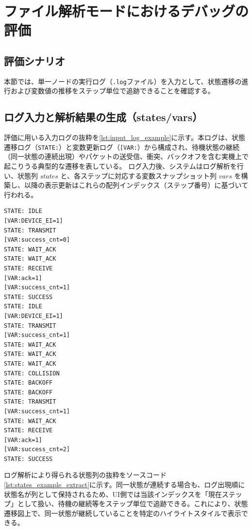 \documentclass[12pt]{jreport}
\begin{document}
\section{ファイル解析モードにおけるデバッグの評価}

\subsection{評価シナリオ}
\begin{par}
本節では、単一ノードの実行ログ（\texttt{.log}ファイル）を入力として、状態遷移の進行および変数値の推移をステップ単位で追跡できることを確認する。
\end{par}

\subsection{ログ入力と解析結果の生成（states/vars）}
\begin{par}
評価に用いる入力ログの抜粋を\ref{lst:input_log_example}に示す。本ログは、状態遷移ログ（\verb|STATE:|）と変数更新ログ（\verb|[VAR:|）から構成され、待機状態の継続（同一状態の連続出現）やパケットの送受信、衝突、バックオフを含む実機上で起こりうる典型的な遷移を表している。
ログ入力後、システムはログ解析を行い、状態列 $states$ と、各ステップに対応する変数スナップショット列 $vars$ を構築し、以降の表示更新はこれらの配列インデックス（ステップ番号）に基づいて行われる。
\end{par}

\begin{lstlisting}[caption=デバッグシステムに入力するログ（抜粋）,label=lst:input_log_example]
STATE: IDLE
[VAR:DEVICE_EI=1]
STATE: TRANSMIT
[VAR:success_cnt=0]
STATE: WAIT_ACK
STATE: WAIT_ACK
STATE: RECEIVE
[VAR:ack=1]
[VAR:success_cnt=1]
STATE: SUCCESS
STATE: IDLE
[VAR:DEVICE_EI=1]
STATE: TRANSMIT
[VAR:success_cnt=1]
STATE: WAIT_ACK
STATE: WAIT_ACK
STATE: WAIT_ACK
STATE: COLLISION
STATE: BACKOFF
STATE: BACKOFF
STATE: TRANSMIT
[VAR:success_cnt=1]
STATE: WAIT_ACK
STATE: RECEIVE
[VAR:ack=1]
[VAR:success_cnt=2]
STATE: SUCCESS
\end{lstlisting}
\vspace{1cm} %

\begin{par}
ログ解析により得られる状態列の抜粋をソースコード\ref{lst:states_example_extract}に示す。同一状態が連続する場合も、ログ出現順に状態名が列として保持されるため、UI側では当該インデックスを「現在ステップ」として扱い、待機の継続等をステップ単位で追跡できる。これにより、状態遷移図上で、同一状態が継続していることを特定のハイライトスタイルで表示できる。
\end{par}
\end{document}
